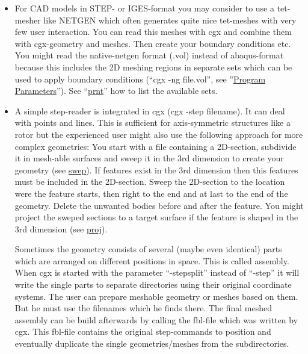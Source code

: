 \documentclass{article}
\providecommand{\htmlref}[2]{\hyperref[#2]{#1}}
\begin{document}
\begin{appendix}
\begin{itemize}
In the GLFW Edition, TetGen 1.6.0 is fully built-in and active out of the box with zero external installation required. When using NETGEN, replace the original ng\_vol source file in the NETGEN package with the modified program ng\_vol from the cgx-distribution and build it again. This version regards a target element size. Tetgen is able to regard that size unchanged.

\item For CAD models in STEP- or IGES-format you may consider to use a tet-mesher like NETGEN \cite{NETGEN} which often generates quite nice tet-meshes with very few user interaction. You can read this meshes with cgx and combine them with cgx-geometry and meshes. Then create your boundary conditions etc. You might read the native-netgen format (.vol) instead of abaqus-format because this includes the 2D meshing regions in separate sets which can be used to apply boundary conditions (``cgx -ng file.vol'', see ''\htmlref{Program Parameters}{Program Parameters}''). See ``\htmlref{prnt}{prnt}'' how to list the available sets.

\item A simple step-reader is integrated in cgx (cgx -step filename). It can deal with points and lines. This is sufficient for axis-symmetric structures like a rotor but the experienced user might also use the following approach for more complex geometries: You start with a file containing a 2D-section, subdivide it in mesh-able surfaces and sweep it in the 3rd dimension to create your geometry (see \htmlref{swep}{swep}). If features exist in the 3rd dimension then this features must be included in the 2D-section. Sweep the 2D-section to the location were the feature starts, then right to the end and at last to the end of the geometry. Delete the unwanted bodies before and after the feature. You might project the sweped sections to a target surface if the feature is shaped in the 3rd dimension (see \htmlref{proj}{proj}).

Sometimes the geometry consists of several (maybe even identical) parts which are arranged on different positions in space. This is called assembly. When cgx is started with the parameter ``-stepsplit'' instead of ``-step'' it will write the single parts to separate directories using their original coordinate systems. The user can prepare meshable geometry or meshes based on them. But he must use the filenames which he finds there. The final meshed assembly can be build afterwards by calling the fbl-file which was written by cgx. This fbl-file contains the original step-commands to position and eventually duplicate the single geometries/meshes from the subdirectories.   
\end{itemize}


\end{appendix}
\end{document}
